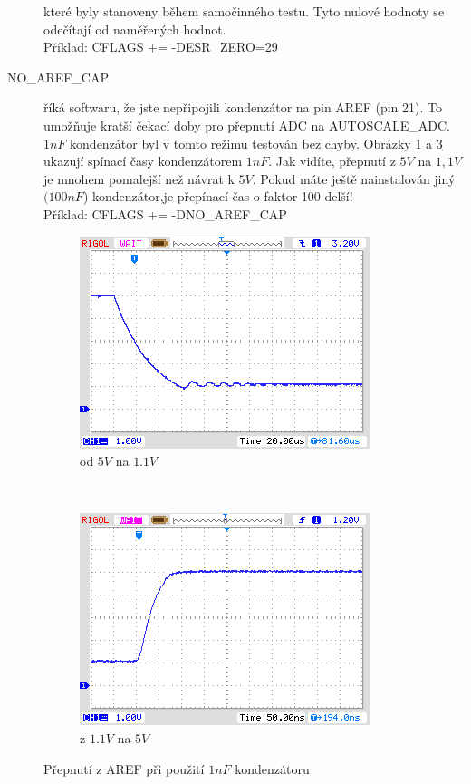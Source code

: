 \begin{description}
které byly stanoveny během samočinného testu.
Tyto nulové hodnoty se odečítají od naměřených hodnot.\\
Příklad: CFLAGS += -DESR\_ZERO=29
  \item[NO\_AREF\_CAP]  říká softwaru, že jste nepřipojili kondenzátor na pin AREF (pin 21).
To umožňuje kratší čekací doby pro přepnutí ADC na AUTOSCALE\_ADC.
\(1nF\) kondenzátor byl v tomto režimu testován bez chyby.
Obrázky \ref{pic:aref1} a \ref{pic:aref5} ukazují spínací časy kondenzátorem \(1nF\).
Jak vidíte, přepnutí z \(5V\) na \(1,1V\) je mnohem pomalejší než návrat k \(5V\).
Pokud máte ještě nainstalován jiný \((100nF\)) kondenzátor,je přepínací čas o faktor 100 delší!\\
Příklad: CFLAGS += -DNO\_AREF\_CAP
\end{description}

\begin{figure}[H]
  \begin{subfigure}[b]{.5\textwidth}
    \centering
    \includegraphics[width=.95\textwidth]{../PNG/AREF2_1V.png}
    \caption{od \(5V\) na \(1.1V\) }
    \label{pic:aref1}
  \end{subfigure}
  ~
  \begin{subfigure}[b]{.5\textwidth}
    \centering
    \includegraphics[width=.95\textwidth]{../PNG/AREF2VCC.png}
    \caption{z \(1.1V\) na \(5V\)}
    \label{pic:aref5}
  \end{subfigure}
  \caption{Přepnutí z AREF při použití \(1nF\) kondenzátoru}
\end{figure}

